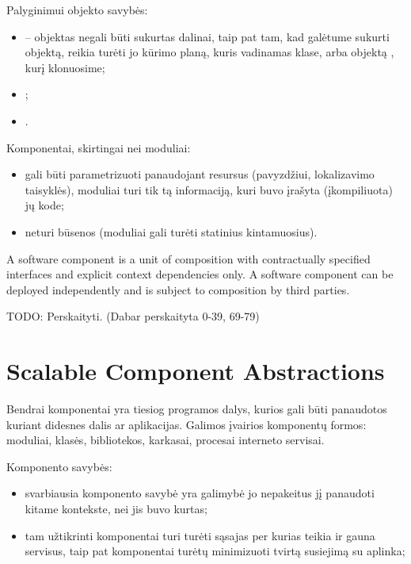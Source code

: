 Palyginimui objekto savybės\cite[36]{cs-beyond-object-oriented-programming}:
\begin{itemize}
  \item {}
    – objektas negali būti sukurtas dalinai, taip pat tam, kad galėtume
    sukurti objektą, reikia turėti jo kūrimo planą, kuris vadinamas klase,
    arba objektą , kurį klonuosime;
  \item {};
  \item {}.
\end{itemize}

Komponentai, skirtingai nei
moduliai\cite[39-40]{cs-beyond-object-oriented-programming}:
\begin{itemize}
  \item gali būti parametrizuoti panaudojant resursus (pavyzdžiui,
    lokalizavimo taisyklės), moduliai turi tik tą informaciją, kuri
    buvo įrašyta (įkompiliuota) jų kode;
  \item neturi būsenos (moduliai gali turėti statinius kintamuosius).
\end{itemize}

\begin{defn}
  A software component is a unit of composition with contractually
  specified interfaces and explicit context dependencies only. A
  software component can be deployed independently and is subject
  to composition by third parties.
  \cite[41]{cs-beyond-object-oriented-programming}
\end{defn}

TODO: Perskaityti. (Dabar perskaityta 0-39, 69-79)

\section{Scalable Component Abstractions}

Bendrai komponentai yra tiesiog programos dalys, kurios gali būti
panaudotos kuriant didesnes dalis ar aplikacijas. Galimos įvairios
komponentų formos: moduliai, klasės, bibliotekos, karkasai, procesai
interneto servisai.

Komponento savybės:
\begin{itemize}
  \item svarbiausia komponento savybė yra galimybė jo nepakeitus jį
    panaudoti kitame kontekste, nei jis buvo kurtas;
  \item tam užtikrinti komponentai turi turėti sąsajas per kurias
    teikia ir gauna servisus, taip pat komponentai turėtų minimizuoti
    tvirtą susiejimą  su aplinka;
\end{itemize}

